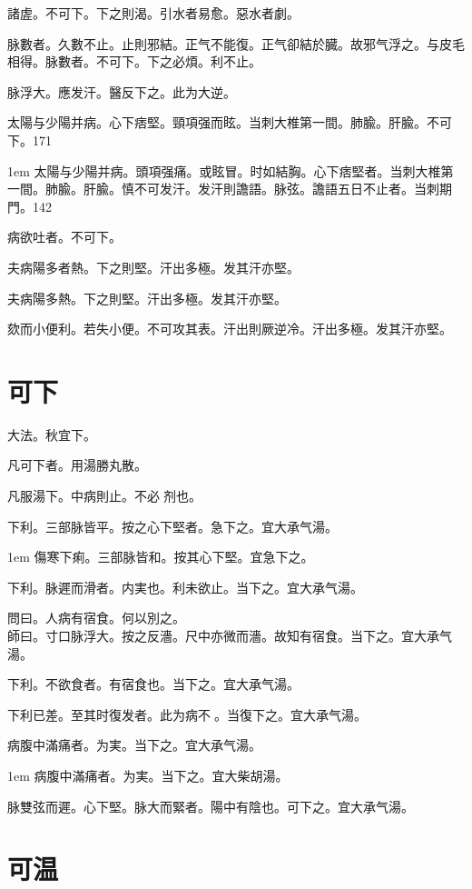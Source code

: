 諸虗。不可下。下之則渴。引水者易愈。惡水者劇。

脉數者。久數不止。止則邪結。正气不能復。正气卻結於臓。故邪气浮之。与皮毛相得。脉數者。不可下。下之必煩。利不止。

脉浮大。應发汗。醫反下之。此为大逆。

太陽与少陽并病。心下痞堅。頸項强而眩。{\khaaitp 当刺大椎第一間。肺腧。肝腧。}不可下。171

\hangindent 1em
太陽与少陽并病。頭項强痛。或眩冒。时如結胸。心下痞堅者。当刺大椎第一間。肺腧。肝腧。慎不可发汗。发汗則譫語。脉弦。譫語五日不止者。当刺期門。142

病欲吐者。不可下。

夫病陽多者熱。下之則堅。汗出多極。发其汗亦堅。

夫病陽多熱。下之則堅。汗出多極。发其汗亦堅。{\yuhan}

欬而小便利。若失小便。不可攻其表。汗出則厥逆冷。汗出多極。发其汗亦堅。{\maijing}

\section{可下}

大法。秋宜下。

凡可下者。用湯勝丸散。

凡服湯下。中病則止。不必{\sungtpii 𥁞}剂也。

下利。三部脉皆平。按之心下堅者。急下之。宜{\khaaitp 大}承气湯。

\hangindent 1em
傷寒下痢。三部脉皆和。按其心下堅。宜急下之。{\gaoben}

下利。脉遲而滑者。{\khaaitp 内}実也。利未欲止。当下之。宜{\khaaitp 大}承气湯。

問曰。人病有宿食。何以別之。\\
師曰。寸口脉浮大。按之反濇。尺中亦微而濇。故知有宿食。当下之。宜{\khaaitp 大}承气湯。

下利。不欲食者。有宿食也。当下之。宜{\khaaitp 大}承气湯。

下利{\khaaitp 已}差。至其时復发者。此为病不{\sungtpii 𥁞}。当復下之。宜{\khaaitp 大}承气湯。

病腹中滿痛者。为実。当下之。宜大承气湯。

\hangindent 1em
病腹中滿痛者。为実。当下之。宜大柴胡湯。

脉雙弦而遲。心下堅。脉大而緊者。陽中有陰也。可下之。宜{\khaaitp 大}承气湯。

\section{可温}


